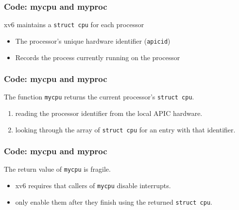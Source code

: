\documentclass{beamer}
\begin{document}

\begin{frame}[t]
  \frametitle{Code: mycpu and myproc}

  xv6 maintains a \texttt{struct cpu} for each processor
  \begin{itemize}
  \item The processor's unique hardware identifier (\texttt{apicid})
  \item Records the process currently running on the processor
  \end{itemize}

  \begin{figure}
    
  \end{figure}
  
\end{frame}


\begin{frame}[t]
  \frametitle{Code: mycpu and myproc}
  The function \texttt{mycpu} returns the current processor's \texttt{struct cpu}.

  \begin{enumerate}
  \item reading the processor identifier from the local APIC hardware.
  \item looking through the array of \texttt{struct cpu} for an entry with that identifier.
  \end{enumerate}
  
\end{frame}


\begin{frame}[t]
  \frametitle{Code: mycpu and myproc}
  The return value of \texttt{mycpu} is fragile. 

  \begin{itemize}
  \item xv6 requires that callers of \texttt{mycpu} disable interrupts.
  \item only enable them after they finish using the returned \texttt{struct cpu}.
  \end{itemize}
  
\end{frame}
\end{document}
